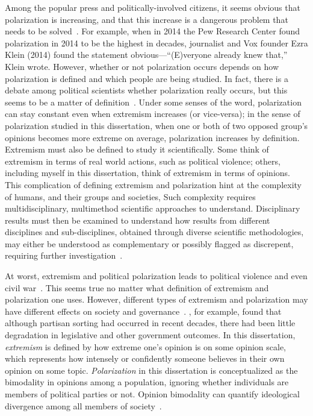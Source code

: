 \documentclass[12pt,letterpaper]{article}
\begin{document}
Among the popular press and politically-involved citizens, it seems obvious
that polarization is increasing, and that this increase is a 
dangerous problem that needs to be solved~\cite{Klein2020}. 
For example, when in 2014 the Pew Research Center found polarization
in 2014 to be the highest in decades, journalist and Vox founder Ezra Klein 
(2014) found the statement obvious---``(E)veryone already knew that,'' Klein
wrote. However, whether or not polarization occurs depends on how polarization 
is defined and which people are being studied. 
In fact, there is a debate among political scientists whether
polarization really occurs, but this seems to be a matter of definition~\cite{Mason2015,Lelkes2016,Kinder2017}.
Under some senses of the word, polarization can stay constant even when extremism increases (or vice-versa);
in the sense of polarization studied in this dissertation,
when one or both of two opposed group's opinions becomes more
extreme on average, polarization increases by definition. Extremism must also
be defined to study it scientifically. Some think of extremism in
terms of real world actions, such as political violence; others, including
myself in this dissertation, think of extremism in terms of opinions. This complication of defining
extremism and polarization hint at the complexity of humans, and their groups
and societies, Such complexity requires multidisciplinary, multimethod
scientific approaches to understand. Disciplinary results must then
be examined to understand how results from different disciplines and sub-disciplines, obtained through
diverse scientific methodologies, may either be understood as complementary or 
possibly flagged as discrepent, requiring further 
investigation~\cite{Cartwright1999,Brewer2013}.

At worst, extremism and political
polarization leads to political violence and even civil war~\cite{Epstein2013,Freeman2018}.
This seems true no matter what definition of extremism and polarization one
uses. However, different types of extremism and polarization may have different
effects on society and governance~\cite{Lelkes2016}. , for example,
found that although partisan sorting had occurred in recent decades, there
had been little degradation in legislative and other government outcomes.
In this dissertation, \emph{extremism} is defined by how extreme one's opinion is on some opinion 
scale, which represents how intensely or confidently someone believes in their
own opinion on some topic. \emph{Polarization} in this dissertation is 
conceptualized as the bimodality in opinions among a population, ignoring 
whether individuals are members of political parties or not. Opinion bimodality
can quantify ideological divergence among all members of society~\cite{Bramson2016,Lelkes2016}. 
\end{document}
